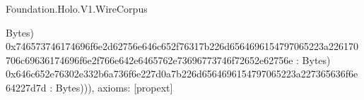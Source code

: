 \begin{lexlean}{Foundation.Holo.V1.WireCorpus}
\begin{semanticmodule}
{Bytes) 0x746573746174696f6e2d62756e646c652f76317b226d6564696154797065223a226170706c69636174696f6e2f766e642e6465762e73696773746f72652e62756e : Bytes) 0x646c652e76302e332b6a736f6e227d0a7b226d6564696154797065223a227365636f6e64227d7d : Bytes))),
  axioms: [propext]
}
\end{semanticmodule}
\end{lexlean}
